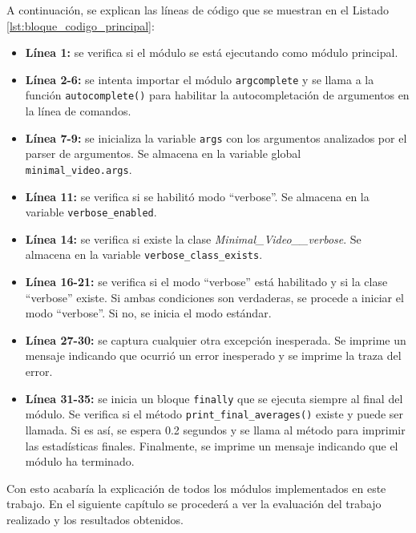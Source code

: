 A continuación, se explican las líneas de código que se muestran en el Listado \ref{lst:bloque_codigo_principal}:
\begin{itemize}
    \item \textbf{Línea 1:} se verifica si el módulo se está ejecutando como módulo principal.
    \item \textbf{Línea 2-6:} se intenta importar el módulo \texttt{argcomplete} y se llama a la función \texttt{autocomplete()} para habilitar la autocompletación de argumentos en la línea de comandos.
    \item \textbf{Línea 7-9:} se inicializa la variable \texttt{args} con los argumentos analizados por el parser de argumentos. Se almacena en la variable global \texttt{minimal\_video.args}.
    \item \textbf{Línea 11:} se verifica si se habilitó modo ``verbose''. Se almacena en la variable \texttt{verbose\_enabled}.
    \item \textbf{Línea 14:} se verifica si existe la clase \textit{Minimal\_Video\_\_verbose}. Se almacena en la variable \texttt{verbose\_class\_exists}.
    \item \textbf{Línea 16-21:} se verifica si el modo ``verbose'' está habilitado y si la clase ``verbose'' existe. Si ambas condiciones son verdaderas, se procede a iniciar el modo ``verbose''. Si no, se inicia el modo estándar.
    \item \textbf{Línea 27-30:} se captura cualquier otra excepción inesperada. Se imprime un mensaje indicando que ocurrió un error inesperado y se imprime la traza del error.
    \item \textbf{Línea 31-35:} se inicia un bloque \texttt{finally} que se ejecuta siempre al final del módulo. Se verifica si el método \texttt{print\_final\_averages()} existe y puede ser llamada. Si es así, se espera 0.2 segundos y se llama al método para imprimir las estadísticas finales. Finalmente, se imprime un mensaje indicando que el módulo ha terminado.
\end{itemize}
\vspace{\baselineskip}

Con esto acabaría la explicación de todos los módulos implementados en este trabajo. En el siguiente capítulo se procederá a ver la evaluación del trabajo realizado y los resultados obtenidos.